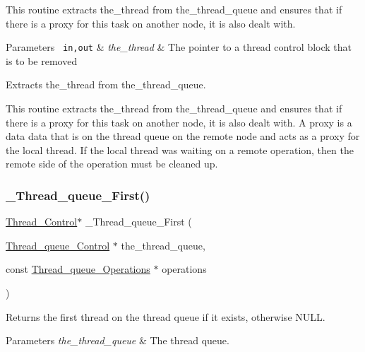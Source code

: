 This routine extracts the\+\_\+thread from the\+\_\+thread\+\_\+queue and ensures that if there is a proxy for this task on another node, it is also dealt with.


\begin{DoxyParams}[1]{Parameters}
\mbox{\texttt{ in,out}}  & {\em the\+\_\+thread} & The pointer to a thread control block that is to be removed\\
\hline
\end{DoxyParams}
Extracts the\+\_\+thread from the\+\_\+thread\+\_\+queue.

This routine extracts the\+\_\+thread from the\+\_\+thread\+\_\+queue and ensures that if there is a proxy for this task on another node, it is also dealt with. A proxy is a data data that is on the thread queue on the remote node and acts as a proxy for the local thread. If the local thread was waiting on a remote operation, then the remote side of the operation must be cleaned up. \mbox{\label{group__RTEMSScoreThreadQueue_ga4408cda9750cde6b1d469759762ecb14}} 
\subsubsection{\texorpdfstring{\_Thread\_queue\_First()}{\_Thread\_queue\_First()}}
{\footnotesize\ttfamily \mbox{\hyperlink{struct__Thread__Control}{Thread\+\_\+\+Control}}$\ast$ \+\_\+\+Thread\+\_\+queue\+\_\+\+First (\begin{DoxyParamCaption}\item[{\mbox{\hyperlink{structThread__queue__Control}{Thread\+\_\+queue\+\_\+\+Control}} $\ast$}]{the\+\_\+thread\+\_\+queue,  }\item[{const \mbox{\hyperlink{structThread__queue__Operations}{Thread\+\_\+queue\+\_\+\+Operations}} $\ast$}]{operations }\end{DoxyParamCaption})}



Returns the first thread on the thread queue if it exists, otherwise {\ttfamily N\+U\+LL}. 


\begin{DoxyParams}{Parameters}
{\em the\+\_\+thread\+\_\+queue} & The thread queue.\\
\hline
\end{DoxyParams}

